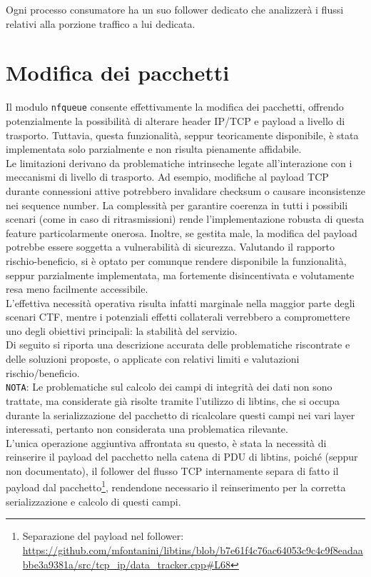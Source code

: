 Ogni processo consumatore ha un suo follower dedicato che analizzerà i flussi relativi alla porzione traffico a lui dedicata.

\section{Modifica dei pacchetti}

Il modulo \texttt{nfqueue} consente effettivamente la modifica dei pacchetti, offrendo potenzialmente la possibilità di alterare header
IP/TCP e payload a livello di trasporto. Tuttavia, questa funzionalità, seppur teoricamente disponibile, è stata implementata solo parzialmente e non risulta pienamente affidabile.\\
Le limitazioni derivano da problematiche intrinseche legate all’interazione con i meccanismi di livello di trasporto. Ad esempio, modifiche al payload TCP durante connessioni attive potrebbero invalidare checksum o causare inconsistenze nei sequence number. La complessità per garantire coerenza in tutti i possibili scenari (come in caso di ritrasmissioni) rende l’implementazione robusta di questa feature particolarmente onerosa. Inoltre, se gestita male, la modifica del payload potrebbe essere soggetta a vulnerabilità di sicurezza. Valutando il rapporto rischio-beneficio, si è optato per comunque rendere disponibile la funzionalità, seppur parzialmente implementata, ma fortemente disincentivata e volutamente resa meno facilmente accessibile.\\
L’effettiva necessità operativa risulta infatti marginale nella maggior parte degli scenari CTF, mentre i potenziali effetti collaterali verrebbero a compromettere uno degli obiettivi principali: la stabilità del servizio.\\
Di seguito si riporta una descrizione accurata delle problematiche riscontrate e delle soluzioni proposte, o applicate con relativi limiti e valutazioni rischio/beneficio.\\
\texttt{NOTA}: Le problematiche sul calcolo dei campi di integrità dei dati non sono trattate, ma considerate già risolte tramite l'utilizzo di libtins, che si occupa durante la serializzazione del pacchetto di ricalcolare questi campi nei vari layer interessati, pertanto non considerata una problematica rilevante.\\
L'unica operazione aggiuntiva affrontata su questo, è stata la necessità di reinserire il payload del pacchetto nella catena di PDU di libtins, poiché (seppur non documentato), il follower del flusso TCP internamente separa di fatto il payload dal pacchetto\footnote{Separazione del payload nel follower: \url{https://github.com/mfontanini/libtins/blob/b7e61f4c76ac64053c9c4c9f8eadaabbe3a9381a/src/tcp_ip/data_tracker.cpp\#L68}}, rendendone necessario il reinserimento per la corretta serializzazione e calcolo di questi campi.\\

